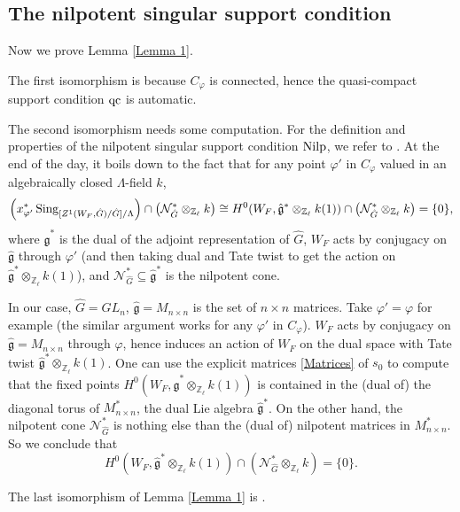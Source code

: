 \subsection{The nilpotent singular support condition} \label{Subsection Nilp}
Now we prove Lemma \ref{Lemma 1}. 

The first isomorphism is because $C_{\varphi}$ is connected, hence the quasi-compact support condition $\operatorname{\operatorname{qc}}$ is automatic. 

The second isomorphism needs some computation. For the definition and properties of the nilpotent singular support condition $\operatorname{\operatorname{Nilp}}$, we refer to \cite[Section VIII.2]{fargues2021geometrization}. At the end of the day, it boils down to the fact that for any point $\varphi'$ in $C_{\varphi}$ valued in an algebraically closed $\Lambda$-field $k$,
$$\left(x_{\varphi'}^*\operatorname{\operatorname{Sing}}_{[Z^1(W_F, \hat{G})/\hat{G}]/\Lambda}\right)\cap \left(\mathcal{N}_{\hat{G}}^*\otimes _{\mathbb{Z}_{\ell}}k\right) \cong H^0(W_F, \hat{\mathfrak{g}}^*\otimes_{\mathbb{Z}_{\ell}}k(1)) \cap \left(\mathcal{N}_{\hat{G}}^*\otimes _{\mathbb{Z}_{\ell}}k\right)=\{0\},$$
where $\hat{\mathfrak{g}}^*$ is the dual of the adjoint representation of $\hat{G}$, $W_F$ acts by conjugacy on $\hat{\mathfrak{g}}$ through $\varphi'$ (and then taking dual and Tate twist to get the action on $\hat{\mathfrak{g}}^*\otimes_{\mathbb{Z}_{\ell}}k(1)$), and $\mathcal{N}_{\hat{G}}^* \subseteq \hat{\mathfrak{g}}^*$ is the nilpotent cone.

In our case, $\hat{G}=GL_n$, $\hat{\mathfrak{g}}=M_{n\times n}$ is the set of $n \times n$ matrices. Take $\varphi'=\varphi$ for example (the similar argument works for any $\varphi'$ in $C_{\varphi}$). $W_F$ acts by conjugacy on $\hat{\mathfrak{g}}=M_{n\times n}$ through $\varphi$, hence induces an action of $W_F$ on the dual space with Tate twist $\hat{\mathfrak{g}}^*\otimes_{\mathbb{Z}_{\ell}}k(1)$. One can use the explicit matrices \ref{Matrices} of $s_0$ to compute that the fixed points $H^0(W_F, \hat{\mathfrak{g}}^*\otimes_{\mathbb{Z}_{\ell}}k(1))$ is contained in the (dual of) the diagonal torus of $M_{n\times n}^*$, the dual Lie algebra $\hat{\mathfrak{g}}^*$. On the other hand, the nilpotent cone $\mathcal{N}_{\hat{G}}^*$ is nothing else than the (dual of) nilpotent matrices in $M_{n\times n}^*$. So we conclude that 
$$H^0(W_F, \hat{\mathfrak{g}}^*\otimes_{\mathbb{Z}_{\ell}}k(1)) \cap \left(\mathcal{N}_{\hat{G}}^*\otimes _{\mathbb{Z}_{\ell}}k\right)=\{0\}.$$

The last isomorphism of Lemma \ref{Lemma 1} is \cite[Theorem VIII.2.9]{fargues2021geometrization}.


